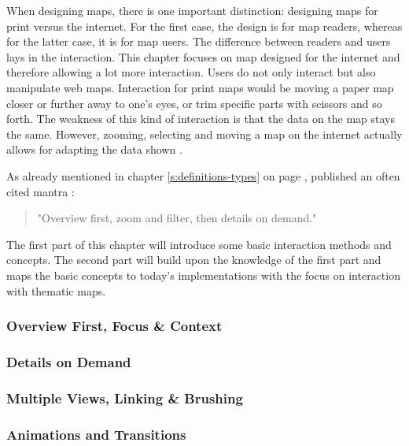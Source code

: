 When designing maps, there is one important distinction: designing maps for print versus the internet. For the first case, the design is for map readers, whereas for the latter case, it is for map users. The difference between readers and users lays in the interaction. This chapter focuses on map designed for the internet and therefore allowing a lot more interaction. Users do not only interact but also manipulate web maps. Interaction for print maps would be moving a paper map closer or further away to one's eyes, or trim specific parts with scissors and so forth. The weakness of this kind of interaction is that the data on the map stays the same. However, zooming, selecting and moving a map on the internet actually allows for adapting the data shown .

As already mentioned in chapter \ref{s:definitions-types} on page \pageref{s:definitions-types}, \citeauthor{Shneiderman1996} published an often cited mantra :
\begin{quote}
"Overview first, zoom and filter, then details on demand."
\end{quote}



The first part of this chapter will introduce some basic interaction methods and concepts. The second part will build upon the knowledge of the first part and maps the basic concepts to today's implementations with the focus on interaction with thematic maps.

\subsubsection{Overview First, Focus \& Context}


\subsubsection{Details on Demand}


\subsubsection{Multiple Views, Linking \& Brushing}
\label{s:linking-brushing}


\subsubsection{Animations and Transitions}


